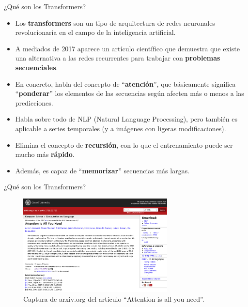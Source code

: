 \begin{frame}{¿Qué son los Transformers?}

\begin{itemize}
  \item Los \textbf{transformers} son un tipo de arquitectura de redes neuronales revolucionaria en el campo de la inteligencia artificial.
  \item A mediados de 2017 aparece un artículo científico que demuestra que existe una alternativa a las redes recurrentes para trabajar con \textbf{problemas secuenciales}.
  \item En concreto, habla del concepto de ``\textbf{atención}'', que básicamente significa ``\textbf{ponderar}'' los elementos de las secuencias según afecten más o menos a las predicciones.
  \item Habla sobre todo de NLP (Natural Language Processing), pero también es aplicable a series temporales (y a imágenes con ligeras modificaciones).
  \item Elimina el concepto de \textbf{recursión}, con lo que el entrenamiento puede ser mucho más \textbf{rápido}.
  \item Además, es capaz de ``\textbf{memorizar}'' secuencias más largas.


\end{itemize}
\end{frame}

\begin{frame}{¿Qué son los Transformers?}

\begin{figure}
    \centering
    \includegraphics[width=0.7\textwidth]{Slides/figures/02_Metodos_Generativos/transf-attention-is-all-you-need.png}
    \caption{Captura de arxiv.org del artículo ``Attention is all you need''.}
\end{figure}

\end{frame}


